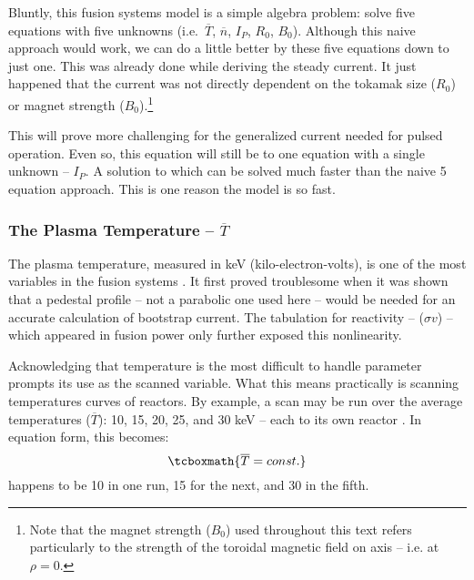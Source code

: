 Bluntly, this fusion systems model is a simple algebra problem: solve five equations with five unknowns (i.e.\ $\overline T$, $\overline n$, $I_P$, $R_0$, $B_0$). Although this naive approach would work, we can do a little better by  these five equations down to just one. This was already done while deriving the steady current. It just happened that the current was not directly dependent on the tokamak size ($R_0$) or magnet strength ($B_0$).\footnote{Note that the magnet strength ($B_0$) used throughout this text refers particularly to the strength of the toroidal magnetic field on axis -- i.e. at $\rho = 0$.}

This will prove more challenging for the generalized current needed for pulsed operation. Even so, this equation will still be  to one equation with a single unknown -- $I_P$. A solution to which can be solved much faster than the naive 5 equation approach. This is one reason the model is so fast.

\subsubsection{The Plasma Temperature -- $\overline T$}

The plasma temperature, measured in keV (kilo-electron-volts), is one of the most  variables in the fusion systems . It first proved troublesome when it was shown that a pedestal profile -- not a parabolic one used here -- would be needed for an accurate calculation of bootstrap current. The  tabulation for reactivity -- ($\sigma v$) -- which appeared in fusion power only further exposed this nonlinearity.

Acknowledging that temperature is the most difficult to handle parameter prompts its use as the scanned variable. What this means practically is scanning temperatures  curves of reactors. By example, a scan may be run over the average temperatures ($\overline T$): 10, 15, 20, 25, and 30 keV --  each  to its own reactor . In equation form, this becomes:
\begin{equation}
	\label{eq:tbar}
	\tcboxmath{
	\overline T = const.
	}
\end{equation}
 happens to be 10  in one run, 15  for the next, and 30  in the fifth.

